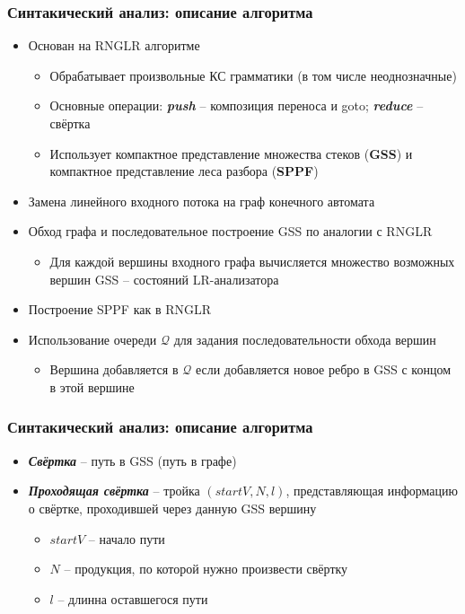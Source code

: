 \documentclass{beamer}
\begin{document}
\begin{frame}
    \transwipe[direction=90]
    \frametitle{Синтакический анализ: описание алгоритма}
    \begin{itemize}         
        \item Основан на RNGLR алгоритме
        \begin{itemize}         
           \item Обрабатывает произвольные КС грамматики (в том числе неоднозначные)
           \item Основные операции: {\bfseries{\textit{push}}} -- композиция переноса и goto; {\bfseries{\textit{reduce}}} -- свёртка
           \item Использует компактное представление множества стеков ({\bfseries GSS}) и компактное представление леса разбора ({\bfseries SPPF})
        \end{itemize}
        \item Замена линейного входного потока на граф конечного автомата
        \item Обход графа и последовательное построение GSS по аналогии с RNGLR
            \begin{itemize}         
                \item Для каждой вершины входного графа вычисляется множество возможных вершин GSS -- состояний LR-анализатора
            \end{itemize}
        \item Построение SPPF как в RNGLR
        \item Использование очереди $\mathcal Q$ для задания последовательности обхода вершин
            \begin{itemize}         
                \item Вершина добавляется в $\mathcal Q$ если добавляется новое ребро в GSS с концом в этой вершине
            \end{itemize}
    \end{itemize}
\end{frame}

\begin{frame}
    \transwipe[direction=90]
    \frametitle{Синтакический анализ: описание алгоритма}
    \begin{itemize}         
         \item {\bfseries{\textit{Свёртка}}} -- путь в GSS (путь в графе)
         \item {\bfseries{\textit{Проходящая свёртка}}} -- тройка $(startV, N, l)$, представляющая информацию о свёртке, проходившей через данную GSS вершину
         \begin{itemize}         
                \item $startV$ -- начало пути
        \item $N$ -- продукция, по которой нужно произвести свёртку
        \item $l$ -- длинна оставшегося пути
         \end{itemize}
    \end{itemize}
\end{frame}
\end{document}
